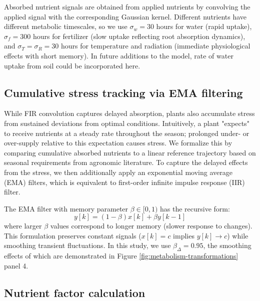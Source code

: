 \documentclass[pdflatex,sn-mathphys-num]{sn-jnl}
\begin{document}
Absorbed nutrient signals are obtained from applied nutrients by convolving the applied signal with the corresponding Gaussian kernel. Different nutrients have different metabolic timescales, so we use $\sigma_{w} = 30$ hours for water (rapid uptake), $\sigma_{f} = 300$ hours for fertilizer (slow uptake reflecting root absorption dynamics), and $\sigma_{T} = \sigma_{R} = 30$ hours for temperature and radiation (immediate physiological effects with short memory). In future additions to the model, rate of water uptake from soil could be incorporated here.

\subsection{Cumulative stress tracking via EMA filtering}\label{subsec:ema-smooth}

While FIR convolution captures delayed absorption, plants also accumulate stress from sustained deviations from optimal conditions. Intuitively, a plant "expects" to receive nutrients at a steady rate throughout the season; prolonged under- or over-supply relative to this expectation causes stress. We formalize this by comparing cumulative absorbed nutrients to a linear reference trajectory based on seasonal requirements from agronomic literature. To capture the delayed effects from the stress, we then additionally apply an exponential moving average (EMA) filters, which is equivalent to first-order infinite impulse response (IIR) filter.  

The EMA filter with memory parameter $\beta \in [0,1)$ has the recursive form:
\begin{equation}
y[k] = (1 - \beta)x[k] + \beta y[k-1]
\label{eqn:iir-filter}
\end{equation}
where larger $\beta$ values correspond to longer memory (slower response to changes). This formulation preserves constant signals ($x[k] = c$ implies $y[k] \rightarrow c$) while smoothing transient fluctuations. In this study, we use $\beta_{\Delta} = 0.95$, the smoothing effects of which are demonstrated in Figure \ref{fig:metabolism-transformations} panel 4.

\subsection{Nutrient factor calculation}\label{subsec:nutrient-factors}
\end{document}
